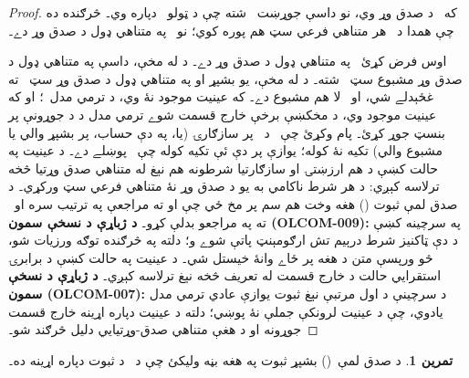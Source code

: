 \documentclass[12pt,a4paper,oneside]{report}
\newcommand{\olfileid}[3]{\gdef\pspart{#1}\gdef\pschapter{#2}\gdef\pssection{#3}}
\gdef\pspart{#2}\gdef\pschapter{#3}\gdef\pssection{}%
\theoremstyle{definition}
\newtheorem{prob}[thm]{تمرين}
\begin{document}
\label{olpseg:OLP-0136-B021:start}
\begin{proof}
که~\LR{$\Gamma$} د صدق وړ وي، نو داسې
جوړښت~
شته چې د ټولو~ دپاره
 وي۔ څرګنده ده چې همدا
 د~\LR{$\Gamma$} هر متناهي
فرعي سټ هم پوره کوي؛ نو~\LR{$\Gamma$} په متناهي ډول د صدق وړ دے۔
\label{olpseg:OLP-0136-B021:end}

\label{olpseg:OLP-0136-B022:start}
اوس فرض کړئ~\LR{$\Gamma$} په متناهي ډول د صدق وړ دے۔ د
   له مخې، داسې په متناهي ډول د صدق وړ
  مشبوع سټ~ شته۔ د
 له مخې،
 يو بشپړ او په متناهي ډول د
صدق وړ سټ~\LR{$\Gamma^*$} ته غځېدلے شي، او~\LR{$\Gamma^*$} لا
هم مشبوع دے۔ که عينيت موجود نۀ وي، د
ترمي مدل~؛ او که عينيت موجود وي، د مخکښې
برخې خارج قسمت شوے ترمي مدل د
 د جوړونې پر بنسټ جوړ کړئ۔
پام وکړئ چې~ د~\LR{$\Gamma^*$} پر
سازګارۍ (يا، په دې حساب، پر بشپړ والي يا مشبوع والي) تکيه
نۀ کوله؛ يوازې پر دې ئې تکيه کوله چې~ پوښلے
دے۔ د عينيت
په حالت کښې د هم ارزښتۍ او سازګارتيا شرطونه هم نېغ له متناهي صدق
وړتيا څخه ترلاسه کېږي: د هر شرط ناکامي به يو د صدق وړ نۀ متناهي
فرعي سټ ورکړي۔ د صدق لمې ثبوت
() هغه وخت هم سم پر مخ ځي چې
 او
 ته مراجعې په ترتيب سره
 او~ ته په مراجعو
بدلې کړو۔
\textbf{د ژباړې د نسخې سمون (OLCOM-009):} په سرچينه کښې د دې
ټاکنيز شرط درېيم تش ارګومېنټ پاتې شوے و؛ دلته په څرګنده توګه
ورزيات شو، څو ورپسې متن د هغه پر ځاے وانۀ خيستل شي۔ د عينيت په حالت کښې د برابرۍ استقرايي حالت د خارج قسمت
له تعريف څخه نېغ ترلاسه کېږي۔
\textbf{د ژباړې د نسخې سمون (OLCOM-007):} د سرچينې د اول مرتبې
نېغ ثبوت يوازې عادي ترمي مدل يادوي، چې د عينيت لرونکې جملې نۀ
پوښي؛ دلته د عينيت دپاره اړينه خارج قسمت جوړونه او د هغې متناهي
صدق-وړتيايي دليل څرګند شو۔
\end{proof}
\label{olpseg:OLP-0136-B022:end}

\label{olpseg:OLP-0136-B023:start}
\begin{prob}
د صدق لمې~() بشپړ ثبوت په هغه بڼه
وليکئ چې د~ د ثبوت
دپاره اړينه ده۔
\end{prob}
\label{olpseg:OLP-0136-B023:end}

\label{olpseg:OLP-0137-B004:start}
\olfileid{fol}{com}{dls}
\label{olpseg:OLP-0137-B004:end}
\end{document}
